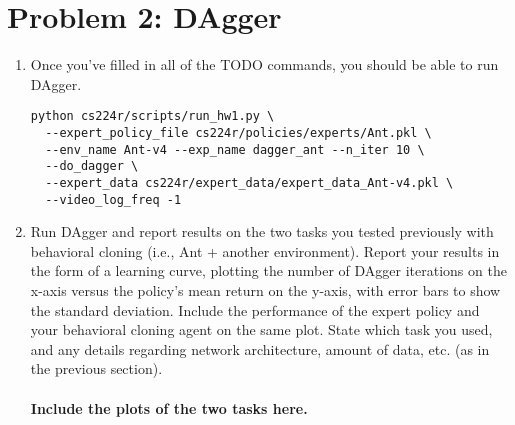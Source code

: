 \documentclass[12pt]{article}
\begin{document}
\begin{enumerate}
\end{enumerate}

\newpage

\section*{Problem 2: DAgger}
\begin{enumerate}
\item Once you’ve filled in all of the TODO commands, you should be able to run DAgger.
\begin{tcolorbox}[width=\linewidth, sharp corners=all, colback=white!95!black]
\begin{verbatim}
python cs224r/scripts/run_hw1.py \
  --expert_policy_file cs224r/policies/experts/Ant.pkl \
  --env_name Ant-v4 --exp_name dagger_ant --n_iter 10 \
  --do_dagger \
  --expert_data cs224r/expert_data/expert_data_Ant-v4.pkl \
  --video_log_freq -1
\end{verbatim}
\end{tcolorbox}
\item Run DAgger and report results on the two tasks you tested previously with behavioral cloning (i.e., Ant + another environment). Report your results in the form of a learning curve, plotting the number of DAgger iterations on the x-axis versus the policy’s mean return on the y-axis, with error bars to show the standard deviation. Include the performance of the expert policy and your behavioral cloning agent on the same plot. State which task you used, and any details regarding network architecture, amount of data, etc. (as in the previous section).\\
\\
\textbf{\color{red}Include the plots of the two tasks here.}
\end{enumerate}

%
%
\end{document}
